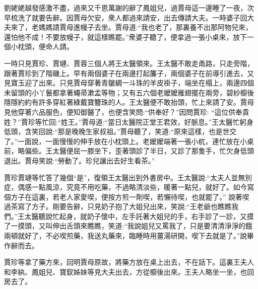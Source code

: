 \begin{parag}
    劉姥姥越發感激不盡，過來又千恩萬謝的辭了鳳姐兒，過賈母這一邊睡了一夜，次早梳洗了就要告辭。因賈母欠安，衆人都過來請安，出去傳請大夫。一時婆子回大夫來了，老媽媽請賈母進幔子去坐。賈母道:“我也老了，那裏養不出那阿物兒來，還怕他不成！不要放幔子，就這樣瞧罷。”衆婆子聽了，便拿過一張小桌來，放下一個小枕頭，便命人請。
\end{parag}


\begin{parag}
    一時只見賈珍、賈璉、賈蓉三個人將王太醫領來。王太醫不敢走甬路，只走旁階，跟著賈珍到了階磯上。早有兩個婆子在兩邊打起簾子，兩個婆子在前導引進去，又見寶玉迎了出來。只見賈母穿著青皺綢一斗珠的羊皮褂子，端坐在榻上，兩邊四個未留頭的小丫鬟都拿著蠅帚漱盂等物；又有五六個老嬤嬤雁翅擺在兩旁，碧紗櫥後隱隱約約有許多穿紅著綠戴寶簪珠的人。王太醫便不敢抬頭，忙上來請了安。賈母見他穿著六品服色，便知御醫了，也便含笑問:“供奉好？”因問賈珍: “這位供奉貴姓？”賈珍等忙回:“姓王。”賈母道:“當日太醫院正堂王君效，好脈息。”王太醫忙躬身低頭，含笑回說:“那是晚晚生家叔祖。”賈母聽了，笑道:“原來這樣，也是世交了。”一面說，一面慢慢的伸手放在小枕頭上。老嬤嬤端著一張小杌，連忙放在小桌前，略偏些。王太醫便屈一膝坐下，歪著頭診了半日，又診了那隻手，忙欠身低頭退出。賈母笑說:“勞動了。珍兒讓出去好生看茶。”
\end{parag}


\begin{parag}
    賈珍賈璉等忙答了幾個“是”，復領王太醫出到外書房中。王太醫說:“太夫人並無別症，偶感一點風涼，究竟不用吃藥，不過略清淡些，暖著一點兒，就好了。如今寫個方子在這裏，若老人家愛喫，便按方煎一劑喫，若懶待喫，也就罷了。” 說著喫過茶寫了方子。剛要告辭，只見奶子抱了大姐兒出來，笑說:“王老爺也瞧瞧我們。”王太醫聽說忙起身，就奶子懷中，左手託著大姐兒的手，右手診了一診，又摸了一摸頭，又叫伸出舌頭來瞧瞧，笑道:“我說姐兒又罵我了，只是要清清淨淨的餓兩頓就好了，不必喫煎藥，我送丸藥來，臨睡時用薑湯研開，喫下去就是了。”說畢作辭而去。
\end{parag}


\begin{parag}
    賈珍等拿了藥方來，回明賈母原故，將藥方放在桌上出去，不在話下。這裏王夫人和李紈、鳳姐兒、寶釵姊妹等見大夫出去，方從櫥後出來。王夫人略坐一坐，也回房去了。
\end{parag}


